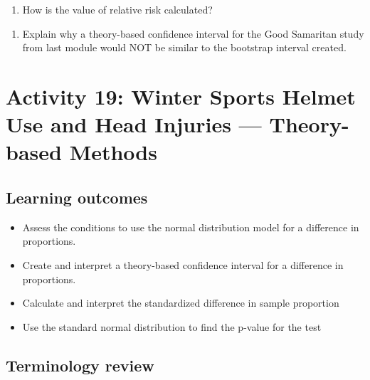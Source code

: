 \documentclass[
]{report}
\providecommand{\tightlist}{%
  \setlength{\itemsep}{0pt}\setlength{\parskip}{0pt}}
\begin{document}
\vspace{0.8in}

\begin{enumerate}
\def\labelenumi{\arabic{enumi}.}
\setcounter{enumi}{1}
\tightlist
\item
  How is the value of relative risk calculated?
\end{enumerate}

\vspace{0.2in}

\begin{enumerate}
\def\labelenumi{\arabic{enumi}.}
\setcounter{enumi}{2}
\tightlist
\item
  Explain why a theory-based confidence interval for the Good Samaritan study from last module would NOT be similar to the bootstrap interval created.
\end{enumerate}

\vspace{1in}

\newpage

\section{Activity 19: Winter Sports Helmet Use and Head Injuries --- Theory-based Methods}\label{activity-19-winter-sports-helmet-use-and-head-injuries-theory-based-methods}


\subsection{Learning outcomes}\label{learning-outcomes-9}

\begin{itemize}
\item
  Assess the conditions to use the normal distribution model for a difference in proportions.
\item
  Create and interpret a theory-based confidence interval for a difference in proportions.
\item
  Calculate and interpret the standardized difference in sample proportion
\item
  Use the standard normal distribution to find the p-value for the test
\end{itemize}

\subsection{Terminology review}\label{terminology-review-8}
\end{document}
